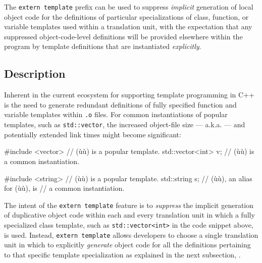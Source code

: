 

\setcounter{table}{0}
\setcounter{footnote}{0}
\setcounter{lstlisting}{0}

The \lstinline!extern!~\lstinline!template! prefix can be used to suppress
\emph{implicit} generation of local object code for the definitions of
particular specializations of class, function, or
variable templates used within a translation unit, with the
expectation that any suppressed object-code-level definitions will be
provided elsewhere within the program by template definitions that are
instantiated \emph{explicitly}.

\subsection[Description]{Description}\label{description}

Inherent in the current ecosystem for supporting template programming in
C++ is the need to generate redundant definitions of fully specified
function and variable templates within \lstinline!.o! files. For common
instantiations of popular templates, such as \lstinline!std::vector!, the
increased object-file size --- a.k.a.  --- and
potentially extended link times might become significant:

\begin{emcppslisting}
#include <vector>    // (ù{}ù) is a popular template.
std::vector<int> v;  // (ù{}ù) is a common instantiation.

#include <string>    // (ù{}ù) is a popular template.
std::string s;       // (ù{}ù), an alias for (ù{}ù), is
                     // a common instantiation.
\end{emcppslisting}

\noindent The intent of the \lstinline!extern!~\lstinline!template! feature is to
\emph{suppress} the implicit generation of duplicative object code
within each and every translation unit in which a fully specialized
class template, such as \lstinline!std::vector<int>! in the code snippet
above, is used. Instead, \lstinline!extern!~\lstinline!template! allows
developers to choose a single translation unit in which to explicitly
\emph{generate} object code for all the definitions pertaining to that
specific template specialization as explained in the next
subsection, .

